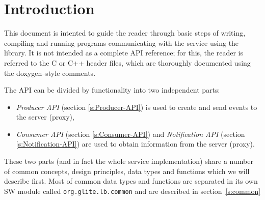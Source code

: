 %
%
%
%

\section{Introduction}

This document is intented to guide the reader through basic steps
of writing, compiling and running programs communicating with the \LB
service using the \LB library. It is not intended as a complete API
reference; for this, the reader is referred to the C or C++ header
files, which are thoroughly documented using the doxygen--style
comments.

The \LB API can be divided by functionality into two independent
parts:
\begin{itemize}
\item \textit{\LB Producer API} (section \ref{s:Producer-API}) is used
to create and send events to the \LB server (proxy),
\item \textit{\LB Consumer API} (section \ref{s:Consumer-API}) and \textit{\LB
Notification API} (section \ref{s:Notification-API}) are used to obtain
information from the  \LB server (proxy).
\end{itemize}
These two parts (and in fact the whole \LB service implementation)
share a number of common concepts, design principles, data types and
functions which we will describe first. Most of common data types and
functions are separated in its own SW module called
\verb'org.glite.lb.common' and are described in section~\ref{s:common}

